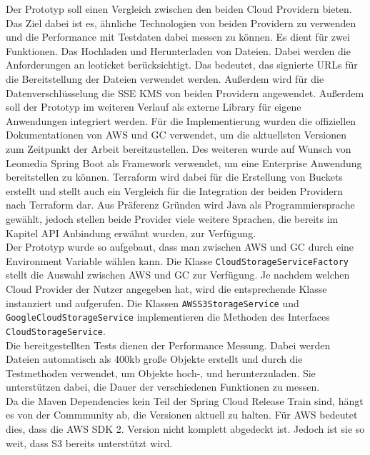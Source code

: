 Der Prototyp soll einen Vergleich zwischen den beiden Cloud Providern bieten. Das Ziel dabei ist es, ähnliche Technologien von beiden Providern zu verwenden und die Performance mit Testdaten dabei messen zu können. Es dient für zwei Funktionen. Das Hochladen und Herunterladen von Dateien. Dabei werden die Anforderungen an leoticket berücksichtigt. Das bedeutet, das signierte URLs für die Bereitstellung der Dateien verwendet werden. Außerdem wird für die Datenverschlüsselung die SSE KMS von beiden Providern angewendet. Außerdem soll der Prototyp im weiteren Verlauf als externe Library für eigene Anwendungen integriert werden. Für die Implementierung wurden die offiziellen Dokumentationen von AWS und GC verwendet, um die aktuellsten Versionen zum Zeitpunkt der Arbeit bereitzustellen. Des weiteren wurde auf Wunsch von Leomedia Spring Boot als Framework verwendet, um eine Enterprise Anwendung bereitstellen zu können. Terraform wird dabei für die Erstellung von Buckets erstellt und stellt auch ein Vergleich für die Integration der beiden Providern nach Terraform dar. Aus Präferenz Gründen wird Java als Programmiersprache gewählt, jedoch stellen beide Provider viele weitere Sprachen, die bereits im Kapitel API Anbindung erwähnt wurden, zur Verfügung.\\

Der Prototyp wurde so aufgebaut, dass man zwischen AWS und GC durch eine Environment Variable wählen kann. Die Klasse \verb|CloudStorageServiceFactory| stellt die Auswahl zwischen AWS und GC zur Verfügung. Je nachdem welchen Cloud Provider der Nutzer angegeben hat, wird die entsprechende Klasse instanziert und aufgerufen. Die Klassen \verb|AWSS3StorageService| und \verb|GoogleCloudStorageService| implementieren die Methoden des Interfaces \verb|CloudStorageService|.\\

Die bereitgestellten Tests dienen der Performance Messung. Dabei werden Dateien automatisch als 400kb große Objekte erstellt und durch die Testmethoden verwendet, um Objekte hoch-, und herunterzuladen. Sie unterstützen dabei, die Dauer der verschiedenen Funktionen zu messen.\\

Da die Maven Dependencies kein Teil der Spring Cloud Release Train sind, hängt es von der Commmunity ab, die Versionen aktuell zu halten. Für AWS bedeutet dies, dass die AWS SDK 2. Version nicht komplett abgedeckt ist. Jedoch ist sie so weit, dass S3 bereits unterstützt wird. 

